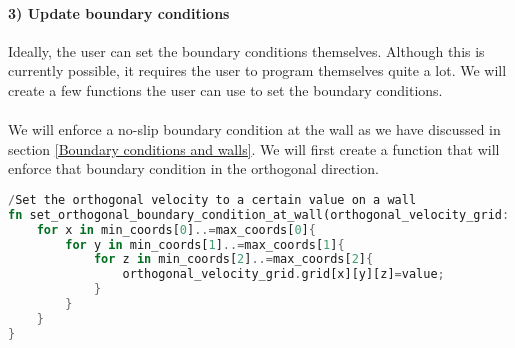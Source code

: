 \documentclass{article}
\begin{document}
\paragraph{3) Update boundary conditions}
Ideally, the user can set the boundary conditions themselves. Although this is currently possible, it requires the user to program themselves quite a lot. We will create a few functions the user can use to set the boundary conditions. 
\\ \\
We will enforce a no-slip boundary condition at the wall as we have discussed in section \ref{Boundary conditions and walls}. We will first create a function that will enforce that boundary condition in the orthogonal direction. 
\begin{lstlisting}[language=Rust, style=boxed, breaklines=true]
/Set the orthogonal velocity to a certain value on a wall
fn set_orthogonal_boundary_condition_at_wall(orthogonal_velocity_grid: &mut VelocityGrid, min_coords: [usize; 3], max_coords: [usize; 3], value: f32){
    for x in min_coords[0]..=max_coords[0]{
        for y in min_coords[1]..=max_coords[1]{
            for z in min_coords[2]..=max_coords[2]{
                orthogonal_velocity_grid.grid[x][y][z]=value;
            }
        }
    }
}
\end{lstlisting}
\end{document}
